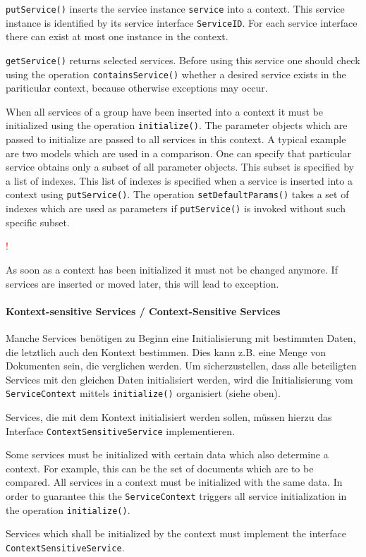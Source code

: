 \documentclass[10pt,a4paper]{scrartcl}
\newcommand{\hinweis}[1]{
\begin{framed}
\begin{minipage}[t]{0.02\textwidth}
\textcolor{red}{\Huge{\sffamily !}}
\end{minipage}
\begin{minipage}[t]{0.94\textwidth}
#1
\end{minipage}
\end{framed}
}
\providecommand{\deng}[2]{#1 / {\sffamily #2}}
\providecommand{\deutsch}[1]{#1}
\providecommand{\englisch}[1]{{\sffamily #1}}
\begin{document}
\englisch{\texttt{putService()} inserts the service instance \texttt{service}
into a context. This service instance is identified by its service interface
\texttt{ServiceID}. For each service interface there can exist at most one
instance in the context.

\texttt{getService()} returns selected services. Before using this service one
should check using the operation \texttt{containsService()} whether a desired
service exists in the pariticular context, because otherwise exceptions may
occur.

When all services of a group have been inserted into a context it must be
initialized using the operation \texttt{initialize()}. The parameter objects
which are passed to initialize are passed to all services in this context. A
typical example are two models which are used in a comparison. One can specify
that particular service obtains only a subset of all parameter objects. This
subset is specified by a list of indexes. This list of indexes is specified when
a service is inserted into a context using \texttt{putService()}. The operation
\texttt{setDefaultParams()} takes a set of indexes which are used as parameters
if \texttt{putService()} is invoked without such specific subset.

\hinweis{As soon as a context has been initialized it must not be changed
anymore. If services are inserted or moved later, this will lead to exception.}}


\paragraph{\deng{Kontext-sensitive Services}{Context-Sensitive Services}}
\deutsch{Manche Services benötigen zu Beginn eine Initialisierung mit bestimmten
Daten, die letztlich auch den Kontext bestimmen. Dies kann z.B. eine Menge von
Dokumenten sein, die verglichen werden. Um sicherzustellen, dass alle
beteiligten Services mit den gleichen Daten initialisiert werden, wird die
Initialisierung vom \texttt{ServiceContext} mittels \texttt{initialize()}
organisiert (siehe oben).

Services, die mit dem Kontext initialisiert werden sollen, müssen hierzu das
Interface \texttt{ContextSensitiveService} implementieren.}

\englisch{Some services must be initialized with certain data which also
determine a context. For example, this can be the set of documents which are to
be compared. All services in a context must be initialized with the same data.
In order to guarantee this the \texttt{ServiceContext} triggers all service
initialization in the operation \texttt{initialize()}.

Services which shall be initialized by the context must implement the interface \texttt{ContextSensitiveService}.}
\end{document}
